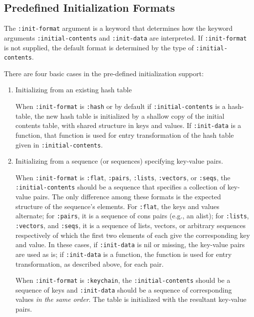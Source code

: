 \documentclass[11pt]{article}
\begin{document}
\subsection{Predefined Initialization Formats}
\label{sec-4-2}


   The \texttt{:init-format} argument is a keyword that determines how the
   keyword arguments \texttt{:initial-contents} and \texttt{:init-data} are interpreted.
   If \texttt{:init-format} is not supplied, the default format is determined
   by the type of \texttt{:initial-contents}.

   There are four basic cases in the pre-defined initialization support:

\begin{enumerate}
\item Initializing from an existing hash table
      
      When \texttt{:init-format} is \texttt{:hash} or by default if \texttt{:initial-contents} is
      a hash-table, the new hash table is initialized by a shallow copy of
      the initial contents table, with shared structure in keys and values.
      If \texttt{:init-data} is a function, that function is used for entry
      transformation of the hash table given in \texttt{:initial-contents}.
\item Initializing from a sequence (or sequences) specifying key-value pairs.
      
      When \texttt{:init-format} is \texttt{:flat}, \texttt{:pairs}, \texttt{:lists}, \texttt{:vectors}, or
      \texttt{:seqs}, the \texttt{:initial-contents} should be a sequence that specifies a
      collection of key-value pairs. The only difference among these formats
      is the expected structure of the sequence's elements. For \texttt{:flat}, the
      keys and values alternate; for \texttt{:pairs}, it is a sequence of cons
      pairs (e.g., an alist); for \texttt{:lists}, \texttt{:vectors}, and \texttt{:seqs}, it is a
      sequence of lists, vectors, or arbitrary sequences respectively of
      which the first two elements of each give the corresponding key and
      value. In these cases, if \texttt{:init-data} is nil or missing, the key-value
      pairs are used as is; if \texttt{:init-data} is a function, the function is
      used for entry transformation, as described above, for each pair.
   
      When \texttt{:init-format} is \texttt{:keychain}, the \texttt{:initial-contents} should
      be a sequence of keys and \texttt{:init-data} should be a sequence of 
      corresponding values \emph{in the same order}. The table is initialized
      with the resultant key-value pairs.


\end{enumerate}
\end{document}

